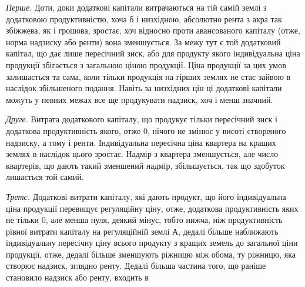 \emph{Перше.} Доти, доки додаткові капітали витрачаються на тій самій землі
з додатковою продуктивністю, хоча б і низхідною, абсолютно рента з акра
так збіжжева, як і грошова, зростає, хоч відносно проти авансованого капіталу
(отже, норма надзиску або ренти) вона зменшується. За межу тут є той додатковий
капітал, що дає лише пересічний зиск, або для продукту якого індивідуальна
ціна продукції збігається з загальною ціною продукції. Ціна продукції
за цих умов залишається та сама, коли тільки продукція на гірших землях
не стає зайвою в наслідок збільшеного подання. Навіть за низхідних цін ці
додаткові капітали можуть у певних межах все ще продукувати надзиск, хоч
і менш значний.

\emph{Друге.} Витрата додаткового капіталу, що продукує тільки пересічний
зиск і додаткова продуктивність якого, отже \deq{} 0, нічого не змінює у висоті
створеного надзиску, а тому і ренти. Індивідуальна пересічна ціна квартера на
кращих землях в наслідок цього зростає. Надмір з квартера зменшується, але
число квартерів, що дають такий зменшений надмір, збільшується, так що здобуток
лишається той самий.

\emph{Третє.} Додаткові витрати капіталу, які дають продукт, що його індивідуальна
ціна продукції перевищує регуляційну ціну, отже, додаткова продуктивність
яких не тільки \deq{} 0, але менша нуля, деякий мінус, тобто нижча,
ніж продуктивність рівної витрати капіталу на регуляційній землі $А$, дедалі
більше наближають індивідуальну пересічну ціну всього продукту з кращих
земель до загальної ціни продукції, отже, дедалі більше зменшують ріжницю
між обома, ту ріжницю, яка створює надзиск, зглядно ренту. Дедалі
більша частина того, що раніше становило надзиск або ренту, входить в
\parbreak{}  %
